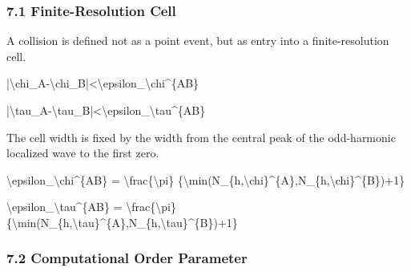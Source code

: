 \documentclass[
  a4paper,
]{article}
\newenvironment{Shaded}{}{}
\newcommand{\NormalTok}[1]{#1}
\begin{document}
\subsubsection{7.1 Finite-Resolution Cell}\label{finite-resolution-cell}

A collision is defined not as a point event, but as entry into a
finite-resolution cell.

\begin{Shaded}
\begin{Highlighting}[]
\NormalTok{|\textbackslash{}chi\_A{-}\textbackslash{}chi\_B|\textless{}\textbackslash{}epsilon\_\textbackslash{}chi\^{}\{AB\}}
\end{Highlighting}
\end{Shaded}

\begin{Shaded}
\begin{Highlighting}[]
\NormalTok{|\textbackslash{}tau\_A{-}\textbackslash{}tau\_B|\textless{}\textbackslash{}epsilon\_\textbackslash{}tau\^{}\{AB\}}
\end{Highlighting}
\end{Shaded}

The cell width is fixed by the width from the central peak of the
odd-harmonic localized wave to the first zero.

\begin{Shaded}
\begin{Highlighting}[]
\NormalTok{\textbackslash{}epsilon\_\textbackslash{}chi\^{}\{AB\}}
\NormalTok{=}
\NormalTok{\textbackslash{}frac\{\textbackslash{}pi\}}
\NormalTok{\{\textbackslash{}min(N\_\{h,\textbackslash{}chi\}\^{}\{A\},N\_\{h,\textbackslash{}chi\}\^{}\{B\})+1\}}
\end{Highlighting}
\end{Shaded}

\begin{Shaded}
\begin{Highlighting}[]
\NormalTok{\textbackslash{}epsilon\_\textbackslash{}tau\^{}\{AB\}}
\NormalTok{=}
\NormalTok{\textbackslash{}frac\{\textbackslash{}pi\}}
\NormalTok{\{\textbackslash{}min(N\_\{h,\textbackslash{}tau\}\^{}\{A\},N\_\{h,\textbackslash{}tau\}\^{}\{B\})+1\}}
\end{Highlighting}
\end{Shaded}

\subsubsection{7.2 Computational Order
Parameter}\label{computational-order-parameter}
\end{document}
